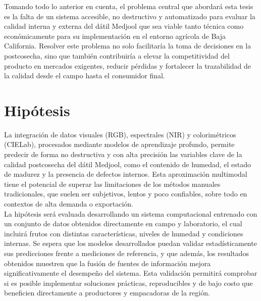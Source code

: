 Tomando todo lo anterior en cuenta, el problema central que abordará esta tesis es la falta de un sistema accesible, no destructivo y automatizado para evaluar la calidad interna y externa del dátil Medjool que sea viable tanto técnica como económicamente para su implementación en el entorno agrícola de Baja California. Resolver este problema no solo facilitaría la toma de decisiones en la postcosecha, sino que también contribuiría a elevar la competitividad del producto en mercados exigentes, reducir pérdidas y fortalecer la trazabilidad de la calidad desde el campo hasta el consumidor final.\\


\section{Hipótesis}

La integración de datos visuales (RGB), espectrales (NIR) y colorimétricos (CIELab), procesados mediante modelos de aprendizaje profundo, permite predecir de forma no destructiva y con alta precisión las variables clave de la calidad postcosecha del dátil Medjool, como el contenido de humedad, el estado de madurez y la presencia de defectos internos. Esta aproximación multimodal tiene el potencial de superar las limitaciones de los métodos manuales tradicionales, que suelen ser subjetivos, lentos y poco confiables, sobre todo en contextos de alta demanda o exportación.\\

La hipótesis será evaluada desarrollando un sistema computacional entrenado con un conjunto de datos obtenidos directamente en campo y laboratorio, el cual incluirá frutos con distintas características, niveles de humedad y condiciones internas. Se espera que los modelos desarrollados puedan validar estadísticamente sus predicciones frente a mediciones de referencia, y que además, los resultados obtenidos muestren que la fusión de fuentes de información mejora significativamente el desempeño del sistema. Esta validación permitirá comprobar si es posible implementar soluciones prácticas, reproducibles y de bajo costo que beneficien directamente a productores y empacadoras de la región.\\


